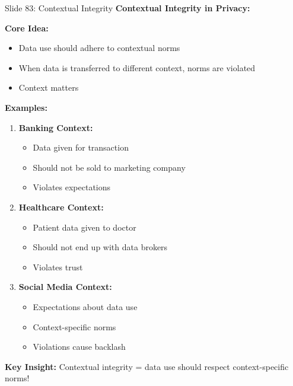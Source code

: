 \documentclass[8pt]{beamer}
\begin{document}
	\begin{frame}{Slide 83: Contextual Integrity}
		\fontsize{6.5}{7.5}\selectfont
		\textbf{Contextual Integrity in Privacy:}
		
		\vspace{0.1cm}
		\textbf{Core Idea:}
		\begin{itemize}
			\item Data use should adhere to contextual norms
			\item When data is transferred to different context, norms are violated
			\item Context matters
		\end{itemize}
		
		\vspace{0.1cm}
		\textbf{Examples:}
		\begin{enumerate}
			\item \textbf{Banking Context:}
			\begin{itemize}
				\item Data given for transaction
				\item Should not be sold to marketing company
				\item Violates expectations
			\end{itemize}
			\item \textbf{Healthcare Context:}
			\begin{itemize}
				\item Patient data given to doctor
				\item Should not end up with data brokers
				\item Violates trust
			\end{itemize}
			\item \textbf{Social Media Context:}
			\begin{itemize}
				\item Expectations about data use
				\item Context-specific norms
				\item Violations cause backlash
			\end{itemize}
		\end{enumerate}
		
		\textcolor{myblue}{\textbf{Key Insight:}} Contextual integrity = \textcolor{myblue}{data use should respect context-specific norms}!
	\end{frame}
	
\end{document}
